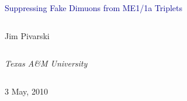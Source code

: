 \documentclass[compress]{beamer}
\begin{document}
\begin{frame}
\vfill
\begin{center}
\textcolor{darkblue}{\Large Suppressing Fake Dimuons from ME1/1a Triplets}

\vfill
\begin{columns}
\begin{center}
\large
Jim Pivarski
\end{center}
\end{columns}

\begin{columns}
\begin{center}
\scriptsize
{\it Texas A\&M University}
\end{center}
\end{columns}

\vfill
 3 May, 2010

\end{center}
\end{frame}


\small
\end{document}

